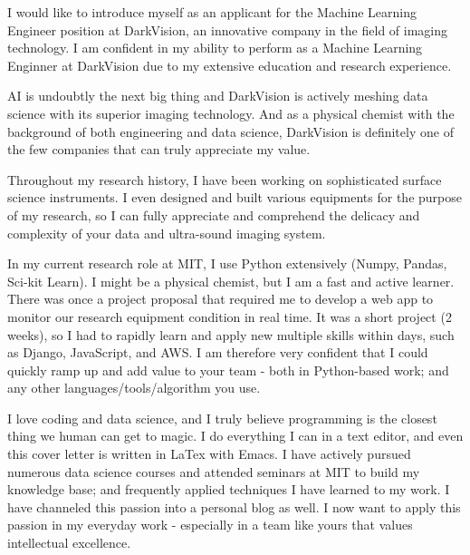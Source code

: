 \documentclass[11pt, letterpaper]{awesome-cv}
\begin{document}
\begin{cvletter}



I would like to introduce myself as an applicant for the Machine Learning
Engineer position at DarkVision, an innovative company in the field of imaging
technology. I am confident in my ability to perform as a Machine Learning
Enginner at DarkVision due to my extensive education and research experience.



AI is undoubtly the next big thing and DarkVision is actively meshing data
science with its superior imaging technology. And as a physical chemist with the
background of both engineering and data science, DarkVision is definitely one of the
few companies that can truly appreciate my value.


Throughout my research history, I have been working on
sophisticated surface science instruments. I even designed and built various
equipments for the purpose of my research, so I can fully appreciate and
comprehend the delicacy and complexity of your data and ultra-sound imaging
system.

In my current research role at MIT, I use Python extensively (Numpy, Pandas,
Sci-kit Learn). I might be a physical chemist, but I am a fast and active
learner. There was once a project proposal that required me to develop a web app
to monitor our research equipment condition in real time. It was a short project
(2 weeks), so I had to rapidly learn and apply new multiple skills within days,
such as Django, JavaScript, and AWS. I am therefore very confident that I could
quickly ramp up and add value to your team - both in Python-based work; and any
other languages/tools/algorithm you use.

I love coding and data science, and I truly believe programming is the closest
thing we human can get to magic. I do everything I can in a text editor, and
even this cover letter is written in LaTex with Emacs.  I have actively pursued
numerous data science courses and attended seminars at MIT to build my knowledge
base; and frequently applied techniques I have learned to my work. I have
channeled this passion into a personal blog as well. I now want to apply this
passion in my everyday work - especially in a team like yours that values
intellectual excellence.


\end{cvletter}


\makeletterclosing
\end{document}

